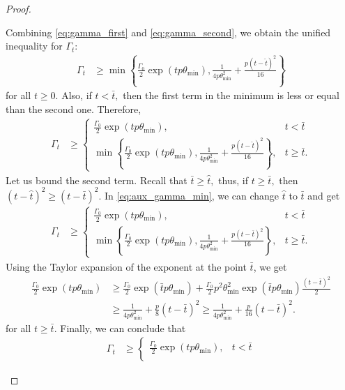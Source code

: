 \documentclass{article} %
\theoremstyle{plain}
\theoremstyle{definition}
\theoremstyle{remark}
\begin{document}
\begin{proof}
\begin{enumerate}
Combining \eqref{eq:gamma_first} and \eqref{eq:gamma_second}, we obtain the unified inequality for $\Gamma_t$:
\begin{align*}
  \Gamma_{t} &\geq \min\left\{\frac{\Gamma_0}{2} \exp \left(t p \theta_{\min}\right), \frac{1}{4 p \theta_{\min}^2} + \frac{p (t - \widehat{t})^2}{16}\right\}
\end{align*}
for all $t \geq 0.$ Also, if $t < \bar{t},$ then the first term in the minimum is less or equal than the second one. Therefore, 
\begin{align}
  \label{eq:aux_gamma_min}
  \Gamma_{t} &\geq \begin{cases}
    \frac{\Gamma_0}{2} \exp \left(t p \theta_{\min}\right), &t < \bar{t} \\
    \min\left\{\frac{\Gamma_0}{2} \exp \left(t p \theta_{\min}\right), \frac{1}{4 p \theta_{\min}^2} + \frac{p (t - \widehat{t})^2}{16}\right\}, &t \geq \bar{t}.
  \end{cases}
\end{align}
Let us bound the second term.
Recall that $\bar{t} \geq \widehat{t},$ thus, if $t \geq \bar{t},$ then $(t - \widehat{t})^2 \geq (t - \bar{t})^2.$ In \eqref{eq:aux_gamma_min}, we can change $\widehat{t}$ to $\bar{t}$ and get
\begin{align*}
  \Gamma_{t} &\geq \begin{cases}
    \frac{\Gamma_0}{2} \exp \left(t p \theta_{\min}\right), &t < \bar{t} \\
    \min\left\{\frac{\Gamma_0}{2} \exp \left(t p \theta_{\min}\right), \frac{1}{4 p \theta_{\min}^2} + \frac{p (t - \bar{t})^2}{16}\right\}, &t \geq \bar{t}.
  \end{cases}
\end{align*}
Using the Taylor expansion of the exponent at the point $\bar{t}$, we get
\begin{align*}
  \frac{\Gamma_0}{2} \exp \left(t p \theta_{\min}\right) &\geq \frac{\Gamma_0}{2} \exp \left(\bar{t} p \theta_{\min}\right) + \frac{\Gamma_0}{2} p^2 \theta_{\min}^2 \exp \left(\bar{t} p \theta_{\min}\right) \frac{(t - \bar{t})^2}{2}\\
  &\geq \frac{1}{4 p \theta_{\min}^2} + \frac{p}{8} (t - \bar{t})^2 \geq \frac{1}{4 p \theta_{\min}^2} + \frac{p}{16} (t - \bar{t})^2.
\end{align*}
for all $t \geq \bar{t}.$ Finally, we can conclude that
\begin{align*}
  \Gamma_{t} &\geq \begin{cases}
    \frac{\Gamma_0}{2} \exp \left(t p \theta_{\min}\right), &t < \bar{t} \\

\end{cases}
\end{align*}
\end{enumerate}
\end{proof}
\end{document}
